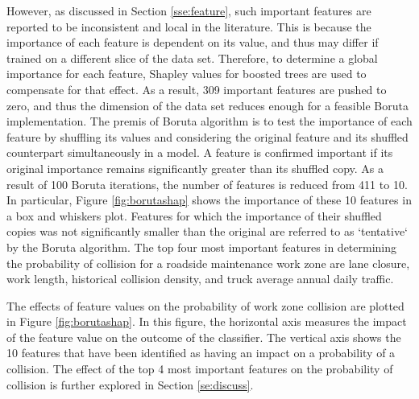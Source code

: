 \documentclass[10pt,a4paper]{article}
\begin{document}
However, as discussed in Section \ref{sse:feature}, such important features are reported to be inconsistent and local in the literature. This is because the importance of each feature is dependent on its value, and thus may differ if trained on a different slice of the data set. Therefore, to determine a global importance for each feature, Shapley values for boosted trees \citep[developed by][]{NIPS2017_7062} are used to compensate for that effect. As a result, 309 important features are pushed to zero, and thus the dimension of the data set reduces enough for a feasible Boruta implementation. The premis of Boruta algorithm is to test the importance of each feature by shuffling its values and considering the original feature and its shuffled counterpart simultaneously in a model. A feature is confirmed important if its original importance remains significantly greater than its shuffled copy. As a result of 100 Boruta iterations, the number of features is reduced from 411 to 10. In particular, Figure \ref{fig:borutashap} shows the importance of these 10 features in a box and whiskers plot. Features for which the importance of their shuffled copies was not significantly smaller than the original are referred to as `tentative` by the Boruta algorithm. The top four most important features in determining the probability of collision for a roadside maintenance work zone are lane closure, work length, historical collision density, and truck average annual daily traffic.

The effects of feature values on the probability of work zone collision are plotted in Figure \ref{fig:borutashap}. In this figure, the horizontal axis measures the impact of the feature value on the outcome of the classifier. The vertical axis shows the 10 features that have been identified as having an impact on a probability of a collision. The effect of the top 4 most important features on the probability of collision is further explored in Section \ref{se:discuss}.

\end{document}
